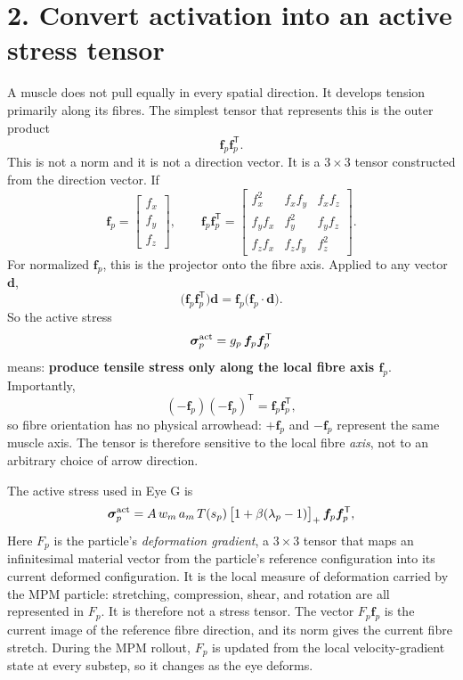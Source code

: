 \documentclass[11pt]{article}
\newcommand{\vect}[1]{\bm{#1}}
\newcommand{\sig}{\boldsymbol{\sigma}}
\begin{document}
\section*{2. Convert activation into an active stress tensor}
A muscle does not pull equally in every spatial direction. It develops tension primarily along its fibres. The simplest tensor that represents this is the outer product
\begin{equation}
\vect f_p\vect f_p^{\mathsf T}.
\label{eq:auto4}
\end{equation}
This is not a norm and it is not a direction vector. It is a $3\times3$ tensor constructed from the direction vector. If
\begin{equation}
\vect f_p=
\begin{bmatrix}
 f_x\\ f_y\\ f_z
\end{bmatrix},
\qquad
\vect f_p\vect f_p^{\mathsf T}=
\begin{bmatrix}
 f_x^2 & f_xf_y & f_xf_z\\
 f_yf_x & f_y^2 & f_yf_z\\
 f_zf_x & f_zf_y & f_z^2
\end{bmatrix}.
\label{eq:auto5}
\end{equation}
For normalized $\vect f_p$, this is the projector onto the fibre axis. Applied to any vector $\vect d$,
\begin{equation}
\bigl(\vect f_p\vect f_p^{\mathsf T}\bigr)\vect d
=
\vect f_p\bigl(\vect f_p\cdot\vect d\bigr).
\label{eq:auto6}
\end{equation}
So the active stress
\begin{equation}
\sig^{\rm act}_p=g_p\,\vect f_p\vect f_p^{\mathsf T}
\label{eq:auto7}
\end{equation}
means: \textbf{produce tensile stress only along the local fibre axis $\vect f_p$}. Importantly,
\begin{equation}
(-\vect f_p)(-\vect f_p)^{\mathsf T}=\vect f_p\vect f_p^{\mathsf T},
\label{eq:auto8}
\end{equation}
so fibre orientation has no physical arrowhead: $+\vect f_p$ and $-\vect f_p$ represent the same muscle axis. The tensor is therefore sensitive to the local fibre \emph{axis}, not to an arbitrary choice of arrow direction.

The active stress used in Eye G is
\begin{equation}
\sig^{\rm act}_p
=
A\,w_m\,a_m\,T(s_p)\,
\bigl[1+\beta(\lambda_p-1)\bigr]_+\,
\vect f_p\vect f_p^{\mathsf T},
\label{eq:active-stress}
\end{equation}
Here $F_p$ is the particle's \emph{deformation gradient}, a $3\times3$ tensor that maps an infinitesimal material vector from the particle's reference configuration into its current deformed configuration. It is the local measure of deformation carried by the MPM particle: stretching, compression, shear, and rotation are all represented in $F_p$. It is therefore not a stress tensor. The vector $F_p\vect f_p$ is the current image of the reference fibre direction, and its norm gives the current fibre stretch. During the MPM rollout, $F_p$ is updated from the local velocity-gradient state at every substep, so it changes as the eye deforms.
\end{document}
